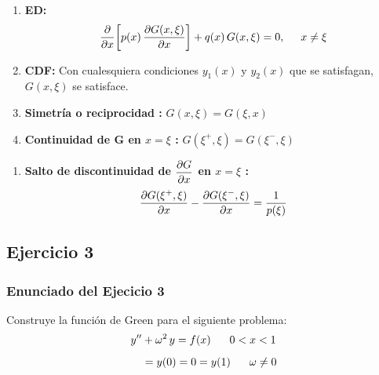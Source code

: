 \documentclass[12pt]{beamer}
\begin{document}
\begin{frame}[plain]
\begin{tcolorbox}[title={\centering Propiedades de la función de Green}]
\begin{enumerate}[<+->]
\item \textbf{ED:}
\begin{align*}
\pdv{x} \bigg[ p (x) \, \pdv{G (x, \xi)}{x} \bigg] + q (x) \, G (x, \xi) = 0, \hspace{0.5cm} x \neq \xi
\end{align*}
\item \textbf{CDF: } Con cualesquiera condiciones $y_{1} (x)$ y $y_{2} (x)$ que se satisfagan, $G (x, \xi)$ se satisface.
\item \textbf{Simetría o reciprocidad :} $G (x, \xi) = G (\xi, x)$
\item \textbf{Continuidad de $\mathbf{G}$ en $x = \xi$ :} $G (\xi^{+}, \xi) = G (\xi^{-}, \xi)$
\seti
\end{enumerate}
\end{tcolorbox}
\end{frame}

\begin{frame}[plain]
\begin{tcolorbox}[title={\centering Propiedades de la función de Green}]
\begin{enumerate}[<+->]
\conti
\item \textbf{Salto de discontinuidad de $\displaystyle \pdv{G}{x}$ en $x = \xi$ :}
\begin{align*}
\pdv{G (\xi^{+}, \xi)}{x} - \pdv{G (\xi^{-}, \xi)}{x} = \dfrac{1}{p (\xi)}
\end{align*}
\end{enumerate}
\end{tcolorbox}
\end{frame}

\subsection*{Ejercicio 3}

\begin{frame}
\frametitle{Enunciado del Ejecicio 3}
Construye la función de Green para el siguiente problema:
\pause
\begin{align*}
{y}^{\prime \prime} &+ \omega^{2} \, y = f(x) \hspace{0.6cm} 0 < x < 1 \\[0.5em]
&=y (0) = 0 = y (1) \hspace{0.6cm} \omega \neq 0
\end{align*}
\end{frame}
\end{document}
